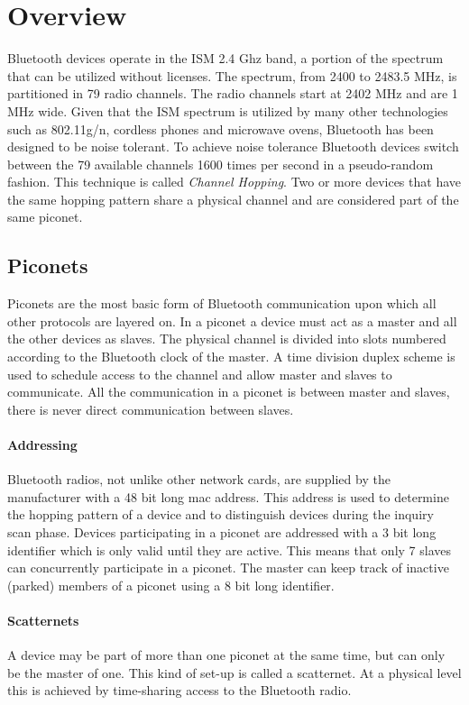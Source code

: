 \section{Overview}
Bluetooth devices operate in the ISM 2.4 Ghz band, a portion of the spectrum that can be utilized without licenses.
The spectrum, from 2400 to 2483.5 MHz, is partitioned in 79 radio channels.
The radio channels start at 2402 MHz and are 1 MHz wide.
Given that the ISM spectrum is utilized by many other technologies such as 802.11g/n, cordless phones and microwave ovens, Bluetooth has been designed to be noise tolerant. 
To achieve noise tolerance Bluetooth devices switch between the 79 available channels 1600 times per second in a pseudo-random fashion. This technique is called \emph{Channel Hopping}.
Two or more devices that have the same hopping pattern share a physical channel and are considered part of the same piconet.

\subsection{Piconets}
Piconets are the most basic form of Bluetooth communication upon which all other protocols are layered on.
In a piconet a device must act as a master and all the other devices as slaves.
The physical channel is divided into slots numbered according to the Bluetooth clock of the master.
A time division duplex scheme is used to schedule access to the channel and allow master and slaves to communicate.
All the communication in a piconet is between master and slaves, there is never direct communication between slaves.

\paragraph{Addressing}
Bluetooth radios, not unlike other network cards, are supplied by the manufacturer with a 48 bit long mac address.
This address is used to determine the hopping pattern of a device and to distinguish devices during the inquiry scan phase.
Devices participating in a piconet are addressed with a 3 bit long identifier which is only valid until they are active.
This means that only 7 slaves can concurrently participate in a piconet.
The master can keep track of inactive (parked) members of a piconet using a 8 bit long identifier.

\paragraph{Scatternets}
A device may be part of more than one piconet at the same time, but can only be the master of one. This kind of set-up is called a scatternet.
At a physical level this is achieved by time-sharing access to the Bluetooth radio.

